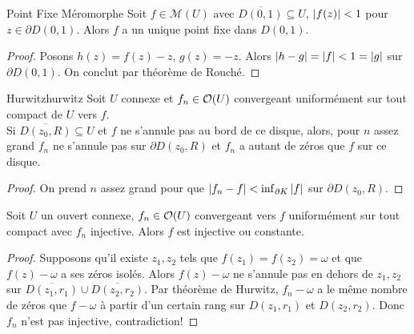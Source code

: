 \documentclass{cours}
\begin{document}
\begin{corollaire}
	{Point Fixe Méromorphe}{}
	Soit $f \in \mathcal{M}(U)$ avec $\overline{D(0, 1)} \subseteq U$, $\left|f(z)\right| < 1$ pour $z \in \partial D(0, 1)$.
	Alors $f$ a un unique point fixe dans $D(0, 1)$. 
\end{corollaire}
\begin{proof}
	Posons $h(z) = f(z) - z$, $g(z) = -z$. Alors $\left|h - g\right| = \left|f\right| < 1 = \left|g\right|$ sur $\partial D(0, 1)$. On conclut par théorème de Rouché. 
\end{proof}

\begin{théorème}
	{Hurwitz}{hurwitz}
	Soit $U$ connexe et $f_{n} \in \mathcal{O}(U)$ convergeant uniformément sur tout compact de $U$ vers $f$.\\
	Si $\overline{D(z_{0}, R)}\subseteq U$ et $f$ ne s'annule pas au bord de ce disque, alors, pour $n$ assez grand $f_{n}$ ne s'annule pas sur $\partial D(z_{0}, R)$ et $f_{n}$ a autant de zéros que $f$ sur ce disque. 
\end{théorème}
\begin{proof}
	On prend $n$ assez grand pour que $\left|f_{n} - f\right| < \inf_{\partial K}\left|f\right|$ sur $\partial D(z_{0}, R)$. 
\end{proof}

\begin{corollaire}
	{}{}
	Soit $U$ un ouvert connexe, $f_{n} \in \mathcal{O}(U)$ convergeant vers $f$ uniformément sur tout compact avec $f_{n}$ injective. 
	Alors $f$ est injective ou constante. 
\end{corollaire}
\begin{proof}
	Supposons qu'il existe $z_{1}, z_{2}$ tels que $f(z_{1}) = f(z_{2}) = \omega$ et que $f(z) - \omega$ a ses zéros isolés. 
	Alors $f(z) - \omega$ ne s'annule pas en dehors de $z_{1}, z_{2}$ sur $\overline{D(z_{1}, r_{1})} \cup \overline{D(z_{2}, r_{2})}$. 
	Par théorème de Hurwitz, $f_{n} - \omega$ a le même nombre de zéros que $f - \omega$ à partir d'un certain rang sur $D(z_{1}, r_{1})$ et $D(z_{2}, r_{2})$. Donc $f_{n}$ n'est pas injective, contradiction!
\end{proof}
\end{document}
